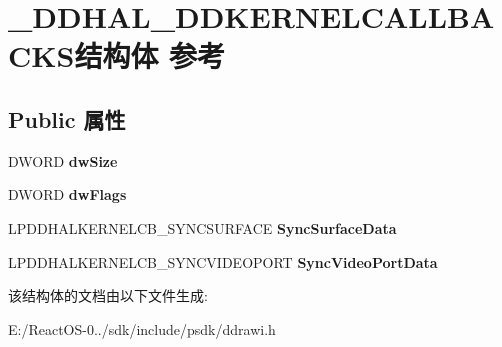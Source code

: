 \hypertarget{struct___d_d_h_a_l___d_d_k_e_r_n_e_l_c_a_l_l_b_a_c_k_s}{}\section{\+\_\+\+D\+D\+H\+A\+L\+\_\+\+D\+D\+K\+E\+R\+N\+E\+L\+C\+A\+L\+L\+B\+A\+C\+K\+S结构体 参考}
\label{struct___d_d_h_a_l___d_d_k_e_r_n_e_l_c_a_l_l_b_a_c_k_s}
\subsection*{Public 属性}
\begin{DoxyCompactItemize}
\item 
\mbox{\label{struct___d_d_h_a_l___d_d_k_e_r_n_e_l_c_a_l_l_b_a_c_k_s_ad856b6cb004d387234f3de77f4772442}} 
D\+W\+O\+RD {\bfseries dw\+Size}
\item 
\mbox{\label{struct___d_d_h_a_l___d_d_k_e_r_n_e_l_c_a_l_l_b_a_c_k_s_a107207d189431009af0125e99dbf7507}} 
D\+W\+O\+RD {\bfseries dw\+Flags}
\item 
\mbox{\label{struct___d_d_h_a_l___d_d_k_e_r_n_e_l_c_a_l_l_b_a_c_k_s_a76ab208b2513b426001fc72523804549}} 
L\+P\+D\+D\+H\+A\+L\+K\+E\+R\+N\+E\+L\+C\+B\+\_\+\+S\+Y\+N\+C\+S\+U\+R\+F\+A\+CE {\bfseries Sync\+Surface\+Data}
\item 
\mbox{\label{struct___d_d_h_a_l___d_d_k_e_r_n_e_l_c_a_l_l_b_a_c_k_s_a8ad289b1f6a8b04d4536028bc14c54a6}} 
L\+P\+D\+D\+H\+A\+L\+K\+E\+R\+N\+E\+L\+C\+B\+\_\+\+S\+Y\+N\+C\+V\+I\+D\+E\+O\+P\+O\+RT {\bfseries Sync\+Video\+Port\+Data}
\end{DoxyCompactItemize}


该结构体的文档由以下文件生成\+:\begin{DoxyCompactItemize}
\item 
E\+:/\+React\+O\+S-\/0../sdk/include/psdk/ddrawi.\+h\end{DoxyCompactItemize}
